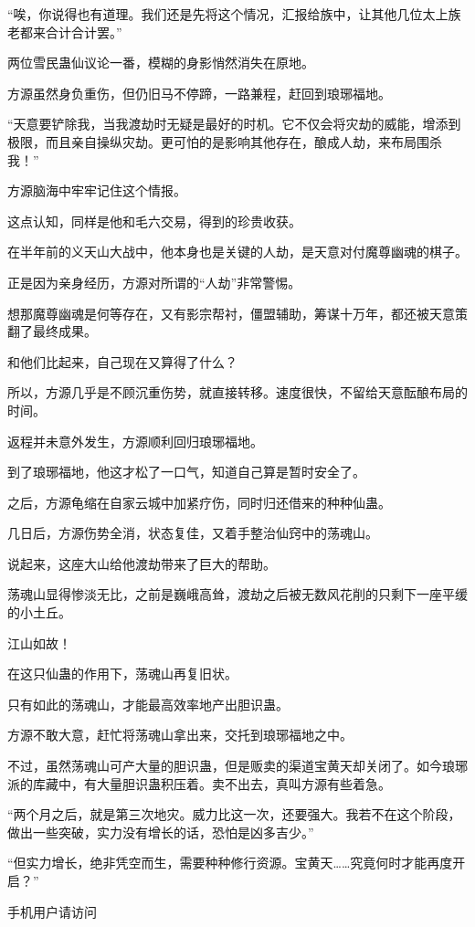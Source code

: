\begin{this_body}
“唉，你说得也有道理。我们还是先将这个情况，汇报给族中，让其他几位太上族老都来合计合计罢。”

两位雪民蛊仙议论一番，模糊的身影悄然消失在原地。

方源虽然身负重伤，但仍旧马不停蹄，一路兼程，赶回到琅琊福地。

“天意要铲除我，当我渡劫时无疑是最好的时机。它不仅会将灾劫的威能，增添到极限，而且亲自操纵灾劫。更可怕的是影响其他存在，酿成人劫，来布局围杀我！”

方源脑海中牢牢记住这个情报。

这点认知，同样是他和毛六交易，得到的珍贵收获。

在半年前的义天山大战中，他本身也是关键的人劫，是天意对付魔尊幽魂的棋子。

正是因为亲身经历，方源对所谓的“人劫”非常警惕。

想那魔尊幽魂是何等存在，又有影宗帮衬，僵盟辅助，筹谋十万年，都还被天意策翻了最终成果。

和他们比起来，自己现在又算得了什么？

所以，方源几乎是不顾沉重伤势，就直接转移。速度很快，不留给天意酝酿布局的时间。

返程并未意外发生，方源顺利回归琅琊福地。

到了琅琊福地，他这才松了一口气，知道自己算是暂时安全了。

之后，方源龟缩在自家云城中加紧疗伤，同时归还借来的种种仙蛊。

几日后，方源伤势全消，状态复佳，又着手整治仙窍中的荡魂山。

说起来，这座大山给他渡劫带来了巨大的帮助。

荡魂山显得惨淡无比，之前是巍峨高耸，渡劫之后被无数风花削的只剩下一座平缓的小土丘。

江山如故！

在这只仙蛊的作用下，荡魂山再复旧状。

只有如此的荡魂山，才能最高效率地产出胆识蛊。

方源不敢大意，赶忙将荡魂山拿出来，交托到琅琊福地之中。

不过，虽然荡魂山可产大量的胆识蛊，但是贩卖的渠道宝黄天却关闭了。如今琅琊派的库藏中，有大量胆识蛊积压着。卖不出去，真叫方源有些着急。

“两个月之后，就是第三次地灾。威力比这一次，还要强大。我若不在这个阶段，做出一些突破，实力没有增长的话，恐怕是凶多吉少。”

“但实力增长，绝非凭空而生，需要种种修行资源。宝黄天……究竟何时才能再度开启？”

手机用户请访问

\end{this_body}

